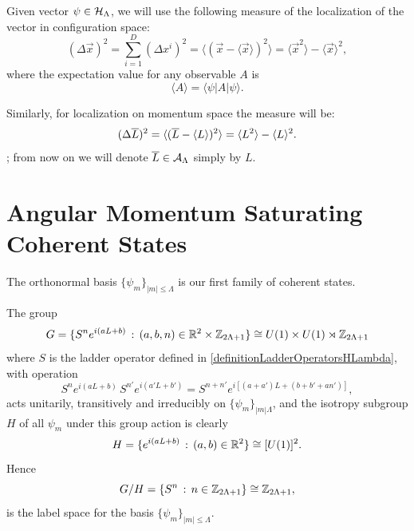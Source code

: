 Given vector $\psi \in \mathcal H_\Lambda$, we will use the following measure of the localization of the vector in configuration space:
\begin{equation}
    (\Delta \vec x)^2 = \sum_{i = 1}^D (\Delta x^i)^2 = \langle (\vec x - \langle \vec x \rangle)^2 \rangle = \langle \vec x^2 \rangle - \langle \vec x \rangle ^2,
\end{equation}
where the expectation value for any observable $A$ is
\begin{equation}
    \langle A \rangle = \langle \psi | A | \psi \rangle.
\end{equation}

Similarly, for localization on momentum space the measure will be:
\begin{equation}
    (\Delta \overline{L})^2 = \langle (\overline{L} - \langle L \rangle )^2 \rangle = \langle L^2 \rangle - \langle L \rangle ^2.
\end{equation};
from now on we will denote $\overline{L} \in \mathcal A_{\Lambda}$ simply by $L$.

\section{Angular Momentum Saturating Coherent States}

The orthonormal basis $\{\psi_m\}_{|m| \leq \Lambda}$ is our first family of coherent states. 

The group 
\begin{equation}
    G = \{S^n e^{i(aL + b)} \,:\, (a, b, n) \in \mathbb{R}^2 \times \mathbb{Z}_{2\Lambda + 1}\} \cong U(1) \times U(1) \rtimes \mathbb{Z}_{2\Lambda + 1}
\end{equation}
where $S$ is the ladder operator defined in \ref{definitionLadderOperatorsHLambda}, with operation
\begin{equation*}
    S^n e^{i(aL+b)}\, S^{n'}e^{i(a'L+b')} = S^{n + n'} e^{i[(a+a')L + (b + b' + an')]},
\end{equation*}
acts unitarily, transitively and irreducibly on $\{\psi_m\}_{|m|\Lambda}$, and the isotropy subgroup $H$ of all $\psi_m$ under this group action is clearly
\begin{equation}
    H = \{e^{i(aL+b)} \,:\, (a, b) \in \mathbb{R}^2 \} \cong [U(1)]^2.
\end{equation}
Hence 
\begin{equation}
    G/H = \{S^n \,:\, n \in \mathbb{Z}_{2\Lambda + 1}\} \cong \mathbb{Z}_{2\Lambda + 1},
\end{equation}
is the label space for the basis $\{\psi_m\}_{|m|\leq \Lambda}$. 


